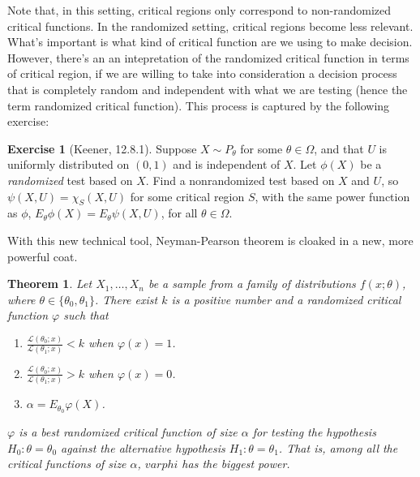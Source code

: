 \documentclass[
  openany]{book}
\providecommand{\tightlist}{%
  \setlength{\itemsep}{0pt}\setlength{\parskip}{0pt}}
\newtheorem{theorem}{Theorem}[chapter]
\theoremstyle{definition}
\theoremstyle{definition}
\theoremstyle{definition}
\newtheorem{exercise}{Exercise}[chapter]
\theoremstyle{definition}
\theoremstyle{remark}
\begin{document}
Note that, in this setting, critical regions only correspond to non-randomized
critical functions.
In the randomized setting, critical regions become less relevant.
What's important is what kind of critical function are we using to make decision.
However, there's an an intepretation of the randomized critical function
in terms of critical region, if we are willing to take into consideration a decision process
that is completely random and independent with what we are testing (hence the term randomized critical function). This process is captured by the following exercise:

\begin{exercise}[Keener, 12.8.1]
Suppose \(X \sim P_\theta\) for some \(\theta \in \Omega\), and that \(U\)
is uniformly distributed on \((0,1)\) and is independent of \(X\).
Let \(\phi(X)\) be a \textit{randomized} test based on \(X\).
Find a nonrandomized test based on \(X\) and \(U\), so \(\psi(X, U) = \chi_S(X, U)\)
for some critical region \(S\), with the same power function
as \(\phi\), \(E_\theta\phi(X) = E_\theta\psi(X, U)\), for all \(\theta \in \Omega\).
\end{exercise}

With this new technical tool, Neyman-Pearson theorem is cloaked in a new, more powerful coat.

\begin{theorem}
Let \(X_1, \dots, X_n\) be a sample from a family of distributions \(f(x;\theta)\),
where \(\theta \in \{\theta_0, \theta_1\}\).
There exist \(k\) is a positive number and a randomized critical function \(\varphi\) such that

\begin{enumerate}
\def\labelenumi{\alph{enumi}.}
\tightlist
\item
  \(\displaystyle{\frac{\mathcal{L}(\theta_0;x)}{\mathcal{L}(\theta_1;x)}} < k\) when \(\varphi(x) = 1\).
\item
  \(\displaystyle\frac{\mathcal{L}(\theta_0;x)}{\mathcal{L}(\theta_1;x)} > k\) when \(\varphi(x) = 0\).
\item
  \(\alpha = E_{\theta_0}\varphi(X)\).
\end{enumerate}

\(\varphi\) is a best randomized critical function of size \(\alpha\) for testing the hypothesis
\(H_0: \theta= \theta_0\) against the alternative hypothesis \(H_1: \theta = \theta_1\). That is, among all the critical functions of size \(\alpha\), \(varphi\) has the biggest power.
\end{theorem}
\end{document}
